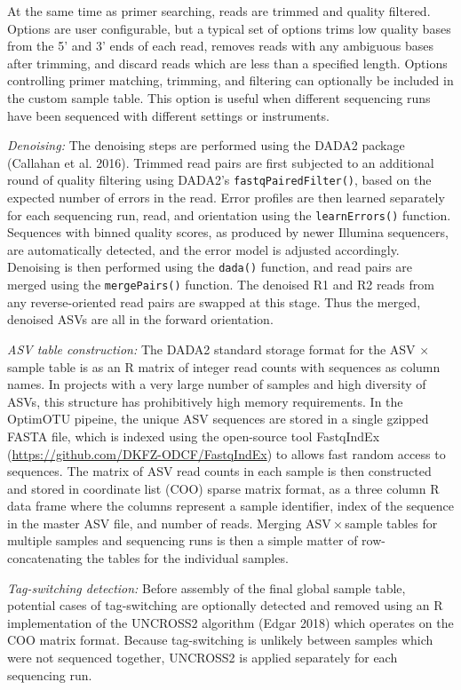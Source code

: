 \documentclass[
]{article}
\begin{document}
At the same time as primer searching, reads are trimmed and quality filtered.
Options are user configurable, but a typical set of options trims low quality bases from the 5' and 3' ends of each read, removes reads with any ambiguous bases after trimming, and discard reads which are less than a specified length.
Options controlling primer matching, trimming, and filtering can optionally be included in the custom sample table.
This option is useful when different sequencing runs have been sequenced with different settings or instruments.

\emph{Denoising:}
The denoising steps are performed using the DADA2 package (Callahan et al. 2016).
Trimmed read pairs are first subjected to an additional round of quality filtering using DADA2's \texttt{fastqPairedFilter()}, based on the expected number of errors in the read.
Error profiles are then learned separately for each sequencing run, read, and orientation using the \texttt{learnErrors()} function.
Sequences with binned quality scores, as produced by newer Illumina sequencers, are automatically detected, and the error model is adjusted accordingly.
Denoising is then performed using the \texttt{dada()} function, and read pairs are merged using the \texttt{mergePairs()} function.
The denoised R1 and R2 reads from any reverse-oriented read pairs are swapped at this stage.
Thus the merged, denoised ASVs are all in the forward orientation.

\emph{ASV table construction:}
The DADA2 standard storage format for the ASV × sample table is as an R matrix of integer read counts with sequences as column names.
In projects with a very large number of samples and high diversity of ASVs, this structure has prohibitively high memory requirements.
In the OptimOTU pipeine, the unique ASV sequences are stored in a single gzipped FASTA file, which is indexed using the open-source tool FastqIndEx (\url{https://github.com/DKFZ-ODCF/FastqIndEx}) to allows fast random access to sequences.
The matrix of ASV read counts in each sample is then constructed and stored in coordinate list (COO) sparse matrix format, as a three column R data frame where the columns represent a sample identifier, index of the sequence in the master ASV file, and number of reads.
Merging ASV\,×\,sample tables for multiple samples and sequencing runs is then a simple matter of row-concatenating the tables for the individual samples.

\emph{Tag-switching detection:}
Before assembly of the final global sample table, potential cases of tag-switching are optionally detected and removed using an R implementation of the UNCROSS2 algorithm (Edgar 2018) which operates on the COO matrix format.
Because tag-switching is unlikely between samples which were not sequenced together, UNCROSS2 is applied separately for each sequencing run.
\end{document}

